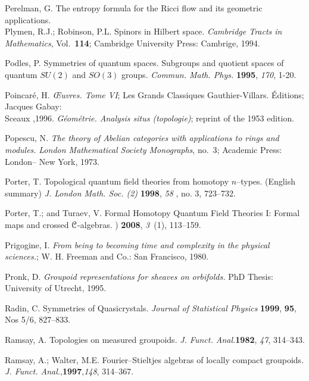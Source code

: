 \documentclass[12pt]{article}
\theoremstyle{plain}
\theoremstyle{definition}
\numberwithin{equation}{section}
\begin{document}
\begin{thebibliography}{199}
Perelman, G. The entropy formula for the Ricci flow and its geometric applications.\\ 

Plymen, R.J.; Robinson, P.L. Spinors in Hilbert space. \emph{Cambridge Tracts in Mathematics}, Vol.~{\bf 114}; Cambridge University Press: Cambrige, 1994.

Podles, P.   Symmetries of quantum spaces. Subgroups and quotient spaces of quantum $SU (2)$ and $SO (3)$ groups. {\em Commun. Math. Phys.} {\bf 1995}, {\em 170}, 1-20.

Poincar{\'e}, H.  {\em {\OE}uvres. Tome {\em VI}}; Les Grands Classiques Gauthier-Villars. \'Editions; Jacques Gabay: \\ Sceaux ,1996. {\em G\'eom\'etrie. Analysis situs (topologie)};
reprint of the 1953 edition.

Popescu, N.  {\em The theory of Abelian categories with applications to rings and modules.}  {\em London Mathematical Society Monographs}, no.~3; Academic Press: London-- New York, 1973.

Porter, T.  Topological quantum field theories from homotopy $n$--types. (English summary) 
{\em J. London Math. Soc. (2) } {\bf 1998}, {\em 58 }, no. 3, 723--732. 

Porter, T.; and Turaev, V.
\newblock Formal Homotopy Quantum Field Theories {I}: Formal   maps and crossed {$\cal C$-}algebras.
 ) {\bf 2008}, {\em 3}~(1), 113--159.

Prigogine, I. {\em From being to becoming time and complexity in the physical sciences.}; W. H. Freeman and Co.: San Francisco, 1980.

Pronk,  D. {\em Groupoid representations for sheaves on orbifolds.}  PhD Thesis: University of Utrecht, 1995.

Radin, C.  Symmetries of Quasicrystals. \emph{Journal of Statistical Physics} {\bf 1999}, {\bf 95}, Nos 5/6, 827--833.

Ramsay, A. Topologies on measured groupoids. {\em J. Funct. Anal.}{\bf 1982}, {\em 47}, 314--343.

Ramsay, A.; Walter, M.E. Fourier--Stieltjes algebras of locally compact groupoids.  {\em J. Funct. Anal.},{\bf 1997},{\em 148}, 314--367. %


\end{thebibliography}
\end{document}
